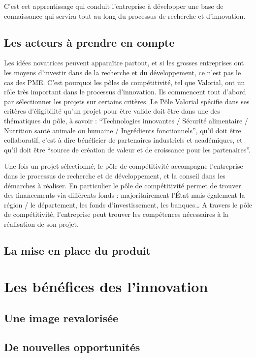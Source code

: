 \documentclass[a4paper,12pt]{report}
\begin{document}
			C’est cet apprentissage qui conduit l’entreprise à développer une base de connaissance qui servira tout au long du processus de recherche et d’innovation.
			
		\subsection{Les acteurs à prendre en compte}
			Les idées novatrices peuvent apparaître partout, et si les grosses entreprises ont les moyens d’investir dans de la recherche et du développement, ce n’est pas le cas des PME. C’est pourquoi les pôles de compétitivité, tel que Valorial, ont un rôle très important dans le processus d’innovation. Ils commencent tout d’abord par sélectionner les projets sur certains critères. Le Pôle Valorial spécifie dans ses critères d’éligibilité\cite{Eligibilite} qu’un projet pour être valide doit être dans une des thématiques du pôle, à savoir : “Technologies innovantes / Sécurité alimentaire / Nutrition santé animale ou humaine / Ingrédients fonctionnels”, qu’il doit être collaboratif, c’est à dire bénéficier de partenaires industriels et académiques, et qu’il doit être “source de création de valeur et de croissance pour les partenaires”.
			
			Une fois un projet sélectionné, le pôle de compétitivité accompagne l’entreprise dans le processus de recherche et de développement, et la conseil dans les démarches à réaliser. En particulier le pôle de compétitivité permet de trouver des financements via différents fonds : majoritairement l’État mais également la région / le département, les fonds d’investissement, les banques…
			A travers le pôle de compétitivité, l’entreprise peut trouver les compétences nécessaires à la réalisation de son projet.
				
		\subsection{La mise en place du produit}
			
	\section{Les bénéfices des l'innovation}
		
		\subsection{Une image revalorisée}
				
		\subsection{De nouvelles opportunités}
				
\end{document}
